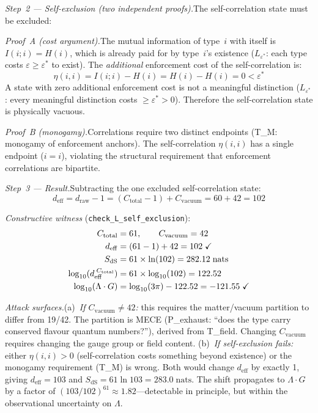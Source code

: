 \documentclass[11pt]{article}
\newcommand{\Ctot}{C_{\mathrm{total}}}
\newcommand{\deff}{d_{\mathrm{eff}}}
\newcommand{\LG}{\Lambda \cdot G}
\newcommand{\eps}{\varepsilon}
\newcommand{\Leps}{L_{\eps^*}}
\newcommand{\nats}{\;\mathrm{nats}}
\begin{document}
\textit{Step~2 --- Self-exclusion (two independent proofs).}\quad The self-correlation state must be excluded:

\emph{Proof~A (cost argument).}\quad The mutual information of type~$i$ with itself is $I(i;i) = H(i)$, which is already paid for by type~$i$'s existence ($\Leps$: each type costs $\eps \ge \eps^*$ to exist).  The \emph{additional} enforcement cost of the self-correlation is:
\begin{equation}
\eta(i,i) = I(i;i) - H(i) = H(i) - H(i) = 0 < \eps^*
\end{equation}
A state with zero additional enforcement cost is not a meaningful distinction ($\Leps$: every meaningful distinction costs $\ge \eps^* > 0$).  Therefore the self-correlation state is physically vacuous.

\emph{Proof~B (monogamy).}\quad Correlations require two distinct endpoints (T\_M: monogamy of enforcement anchors).  The self-correlation $\eta(i,i)$ has a single endpoint ($i = i$), violating the structural requirement that enforcement correlations are bipartite.

\textit{Step~3 --- Result.}\quad Subtracting the one excluded self-correlation state:
\begin{equation}
\deff = d_{\mathrm{raw}} - 1 = (\Ctot - 1) + C_{\mathrm{vacuum}} = 60 + 42 = 102
\end{equation}

\textit{Constructive witness} (\texttt{check\_L\_self\_exclusion}):
\begin{align}
\Ctot &= 61, \qquad C_{\mathrm{vacuum}} = 42 \notag\\
\deff &= (61 - 1) + 42 = 102 \;\checkmark \notag\\
S_{\mathrm{dS}} &= 61 \times \ln(102) = 282.12\nats \notag\\
\log_{10}(\deff^{\;\Ctot}) &= 61 \times \log_{10}(102) = 122.52 \notag\\
\log_{10}(\LG) &= \log_{10}(3\pi) - 122.52 = -121.55 \;\checkmark
\end{align}

\textit{Attack surfaces.}\quad (a)~\emph{If $C_{\mathrm{vacuum}} \ne 42$:} this requires the matter/vacuum partition to differ from 19/42.  The partition is MECE (P\_exhaust: ``does the type carry conserved flavour quantum numbers?''), derived from T\_field.  Changing $C_{\mathrm{vacuum}}$ requires changing the gauge group or field content.  (b)~\emph{If self-exclusion fails:} either $\eta(i,i) > 0$ (self-correlation costs something beyond existence) or the monogamy requirement (T\_M) is wrong.  Both would change $\deff$ by exactly 1, giving $\deff = 103$ and $S_{\mathrm{dS}} = 61\ln 103 = 283.0\nats$.  The shift propagates to $\LG$ by a factor of $(103/102)^{61} \approx 1.82$---detectable in principle, but within the observational uncertainty on $\Lambda$.
\end{document}
